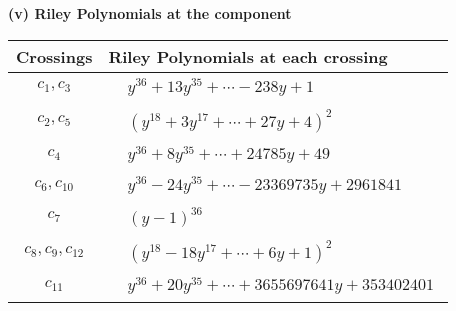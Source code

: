 \documentclass[1p]{elsarticle_modified}
\theoremstyle{definition}
\begin{document}
\flushleft \textbf{(v) Riley Polynomials at the component}\newline \\
\begin{tabular}{m{50pt}|m{274pt}}
Crossings & \hspace{64pt}Riley Polynomials at each crossing \\
\hline $$\begin{aligned}c_{1},c_{3}\end{aligned}$$&$\begin{aligned}
&y^{36}+13 y^{35}+\cdots-238 y+1
\end{aligned}$\\
\hline $$\begin{aligned}c_{2},c_{5}\end{aligned}$$&$\begin{aligned}
&(y^{18}+3 y^{17}+\cdots+27 y+4)^{2}
\end{aligned}$\\
\hline $$\begin{aligned}c_{4}\end{aligned}$$&$\begin{aligned}
&y^{36}+8 y^{35}+\cdots+24785 y+49
\end{aligned}$\\
\hline $$\begin{aligned}c_{6},c_{10}\end{aligned}$$&$\begin{aligned}
&y^{36}-24 y^{35}+\cdots-23369735 y+2961841
\end{aligned}$\\
\hline $$\begin{aligned}c_{7}\end{aligned}$$&$\begin{aligned}
&(y-1)^{36}
\end{aligned}$\\
\hline $$\begin{aligned}c_{8},c_{9},c_{12}\end{aligned}$$&$\begin{aligned}
&(y^{18}-18 y^{17}+\cdots+6 y+1)^{2}
\end{aligned}$\\
\hline $$\begin{aligned}c_{11}\end{aligned}$$&$\begin{aligned}
&y^{36}+20 y^{35}+\cdots+3655697641 y+353402401
\end{aligned}$\\
\hline
\end{tabular}\\~\\
\end{document}
